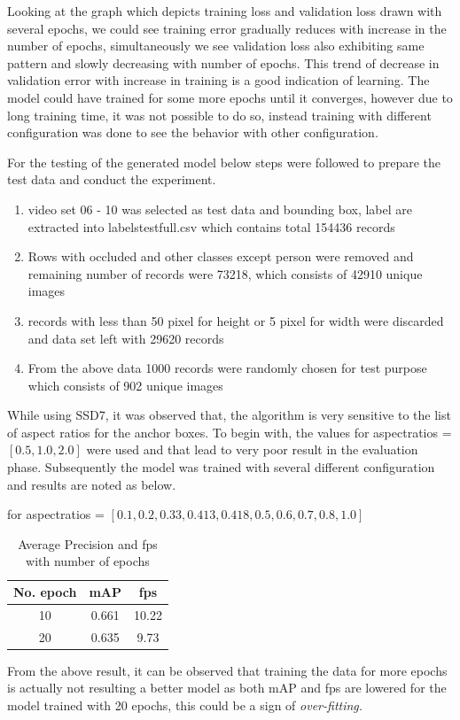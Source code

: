 \newpara
Looking at the graph which depicts training loss and validation loss drawn with several epochs, we could see training error gradually reduces with increase in the number of epochs, simultaneously we see validation loss also exhibiting same pattern and slowly decreasing with number of epochs. This trend of decrease in validation error with increase in training is a good indication of learning. The model could have trained for some more epochs until it converges, however due to long training time, it was not possible to do so, instead training with different configuration was done to see the behavior with other configuration.

For the testing of the generated model below steps were followed to prepare the test data and conduct the experiment.
\begin{enumerate}
	\item video set 06 - 10 was selected as test data and bounding box, label are extracted into labels\textunderscore test\textunderscore full.csv which contains total 154436 records
	\item Rows with occluded and other classes except person were removed and remaining number of records were 73218, which consists of 42910 unique images 
	\item records with less than 50 pixel for height or 5 pixel for width were discarded and data set left with 29620 records
	\item From the above data 1000 records were randomly chosen for test purpose which consists of 902 unique images
\end{enumerate}

\newpara
While using SSD7, it was observed that, the algorithm is very sensitive to the list of aspect ratios for the anchor boxes. To begin with, the values for aspect\textunderscore ratios = $[0.5, 1.0, 2.0]$ were used and that lead to very poor result in the evaluation phase. Subsequently the model was trained with several different configuration and results are noted as below.

for aspect\textunderscore ratios = $[0.1, 0.2, 0.33, 0.413, 0.418, 0.5, 0.6, 0.7, 0.8, 1.0]$
\begin{table}[H]
\begin{center}
 \begin{tabular}{||c c c||} 
 \hline
 No. epoch & mAP & fps\\ [0.8ex] 
 \hline\hline
 10 & 0.661 & 10.22\\ 
 \hline
 20  & 0.635 & 9.73 \\
\hline
\end{tabular}
\caption{Average Precision and fps with number of epochs}
\end{center}
\end{table}
From the above result, it can be observed that training the data for more epochs is actually not resulting a better model as both mAP and fps are lowered for the model trained with 20 epochs, this could be a sign of \textit{over-fitting.}

